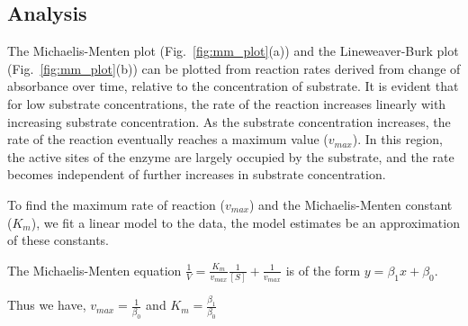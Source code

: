 \documentclass[a4paper,10pt]{article}
\begin{document}
            \subsection*{Analysis}
                The Michaelis-Menten plot (Fig.~\ref{fig:mm_plot}(a)) and the Lineweaver-Burk plot 
                (Fig.~\ref{fig:mm_plot}(b)) can be plotted from reaction rates derived 
                from change of absorbance over time, relative to the concentration of substrate. 
                It is evident that for low substrate concentrations, the rate of the reaction increases 
                linearly with increasing substrate concentration. As the substrate concentration increases, 
                the rate of the reaction eventually reaches a maximum value ($v_{max}$). 
                In this region, the active sites of the enzyme are largely occupied by the substrate, 
                and the rate becomes independent of further increases in substrate concentration.

                To find the maximum rate of reaction ($v_{max}$) and the Michaelis-Menten constant ($K_m$),
                we fit a linear model to the data, the model estimates be an approximation of these constants.

                The Michaelis-Menten equation
                $ \frac{1}{V} = \frac{K_m}{v_{max}}\frac{1}{[S]} + \frac{1}{v_{max}} $
                is of the form
                $ y = \beta_1x + \beta_0 $.
 
                \begin{center}
                    Thus we have,
                    $ v_{max} = \frac{1}{\beta_0} $ and $ K_m = \frac{\beta_1}{\beta_0}  $
                \end{center}
\end{document}
